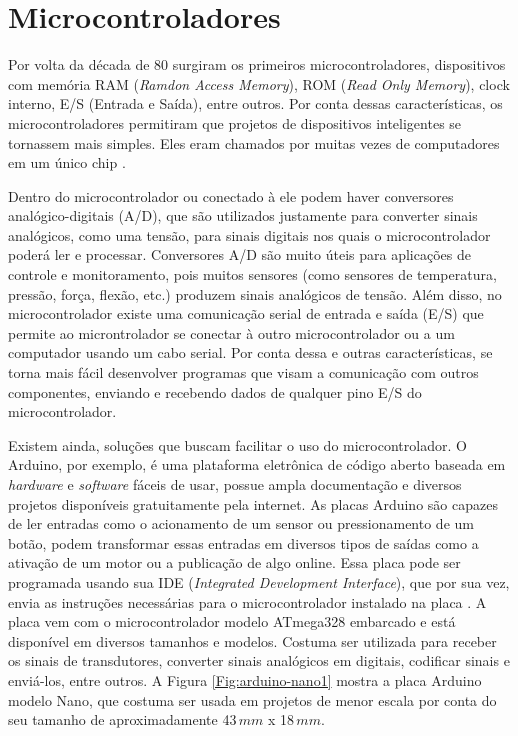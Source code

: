 \documentclass[
	12pt,				%
	openright,			%
	oneside,			%
	a4paper,			%
	english,			%
	brazil				%
	]{abntex2}
\begin{document}

		\section{Microcontroladores}

		Por volta da década de 80 surgiram os primeiros microcontroladores, dispositivos com memória RAM (\textit{Ramdon Access Memory}), ROM (\textit{Read Only Memory}), clock interno, E/S (Entrada e Saída), entre outros. Por conta dessas características, os microcontroladores permitiram que projetos de dispositivos inteligentes se tornassem mais simples. Eles eram chamados por muitas vezes de computadores em um único chip \cite{pereiramicrocontroladores}. 

		Dentro do microcontrolador ou conectado à ele podem haver conversores analógico-digitais (A/D), que são utilizados justamente para converter sinais analógicos, como uma tensão, para sinais digitais nos quais o microcontrolador poderá ler e processar. Conversores A/D são muito úteis para aplicações de controle e monitoramento, pois muitos sensores (como sensores de temperatura, pressão, força, flexão, etc.) produzem sinais analógicos de tensão. Além disso, no microcontrolador existe uma comunicação serial de entrada e saída (E/S) que permite ao microntrolador se conectar à outro microcontrolador ou a um computador usando um cabo serial. Por conta dessa e outras características, se torna mais fácil desenvolver programas que visam a comunicação com outros componentes, enviando e recebendo dados de qualquer pino E/S do microcontrolador. \cite{ibrahim2011advanced}

		Existem ainda, soluções que buscam facilitar o uso do microcontrolador. O Arduino, por exemplo, é uma plataforma eletrônica de código aberto baseada em \textit{hardware} e \textit{software} fáceis de usar, possue ampla documentação e diversos projetos disponíveis gratuitamente pela internet. As placas Arduino são capazes de ler entradas como o acionamento de um sensor ou pressionamento de um botão, podem transformar essas entradas em diversos tipos de saídas como a ativação de um motor ou a publicação de algo online. Essa placa pode ser programada usando sua IDE (\textit{Integrated Development Interface}), que por sua vez, envia as instruções necessárias para o microcontrolador instalado na placa \cite{arduinosite}. A placa vem com o microcontrolador modelo ATmega328 embarcado e está disponível em diversos tamanhos e modelos. Costuma ser utilizada para receber os sinais de transdutores, converter sinais analógicos em digitais, codificar sinais e enviá-los, entre outros. A Figura \ref{Fig:arduino-nano1} mostra a placa Arduino modelo Nano, que costuma ser usada em projetos de menor escala por conta do seu tamanho de aproximadamente 43$\,mm$ x 18$\,mm$.
	
\end{document}
